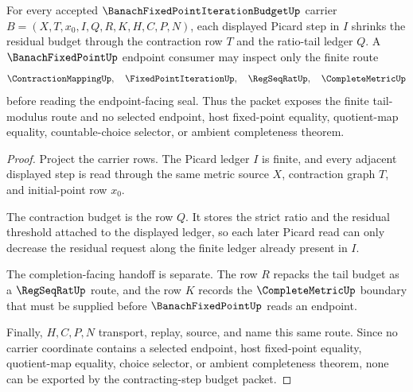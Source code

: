\begin{theorem}
\label{thm:banach-fixed-point-contracting-step-budget}
For every accepted $\BanachFixedPointIterationBudgetUp$ carrier $B=(X,T,x_0,I,Q,R,K,H,C,P,N)$, each displayed Picard step in $I$ shrinks the residual budget through the contraction row $T$ and the ratio-tail ledger $Q$. A $\BanachFixedPointUp$ endpoint consumer may inspect only the finite route
$$
\ContractionMappingUp,\quad \FixedPointIterationUp,\quad \RegSeqRatUp,\quad \CompleteMetricUp
$$
before reading the endpoint-facing seal. Thus the packet exposes the finite tail-modulus route and no selected endpoint, host fixed-point equality, quotient-map equality, countable-choice selector, or ambient completeness theorem.
\end{theorem}
\begin{proof}
Project the carrier rows. The Picard ledger $I$ is finite, and every adjacent displayed step is read through the same metric source $X$, contraction graph $T$, and initial-point row $x_0$.

The contraction budget is the row $Q$. It stores the strict ratio and the residual threshold attached to the displayed ledger, so each later Picard read can only decrease the residual request along the finite ledger already present in $I$.

The completion-facing handoff is separate. The row $R$ repacks the tail budget as a $\RegSeqRatUp$ route, and the row $K$ records the $\CompleteMetricUp$ boundary that must be supplied before $\BanachFixedPointUp$ reads an endpoint.

Finally, $H,C,P,N$ transport, replay, source, and name this same route. Since no carrier coordinate contains a selected endpoint, host fixed-point equality, quotient-map equality, choice selector, or ambient completeness theorem, none can be exported by the contracting-step budget packet.
\end{proof}


